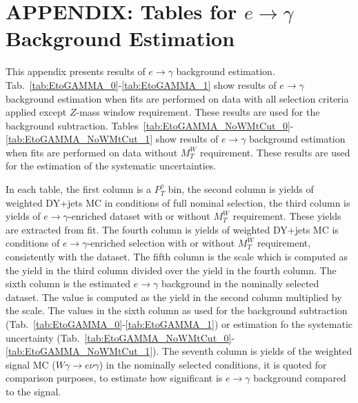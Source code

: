 \chapter{APPENDIX: Tables for $e\rightarrow\gamma$ Background Estimation}
\label{sec:etogTables}

This appendix presents results of $e\rightarrow\gamma$ background estimation. Tab.~\ref{tab:EtoGAMMA_0}-\ref{tab:EtoGAMMA_1} show results of $e\rightarrow\gamma$ background estimation when fits are performed on data with all selection criteria applied except $Z$-mass window requirement. These results are used for the background subtraction. Tables~\ref{tab:EtoGAMMA_NoWMtCut_0}-\ref{tab:EtoGAMMA_NoWMtCut_1} show results of $e\rightarrow\gamma$ background estimation when fits are performed on data without $M_T^W$ requirement. These results are used for the estimation of the systematic uncertainties.

In each table, the first column is a $P_T^{\gamma}$ bin, the second column is yields of weighted DY+jets MC in conditions of full nominal selection, the third column is yields of $e\rightarrow\gamma$-enriched dataset with or without $M_T^W$ requirement. These yields are extracted from fit. The fourth column is yields of weighted DY+jets MC is conditions of $e\rightarrow\gamma$-enriched selection with or without $M_T^W$ requirement, consistently with the dataset. The fifth column is the scale which is computed as the yield in the third column divided over the yield in the fourth column. The sixth column is the estimated $e\rightarrow\gamma$ background in the nominally selected dataset. The value is computed as the yield in the second column multiplied by the scale. The values in the sixth column as used for the background subtraction  (Tab.~\ref{tab:EtoGAMMA_0}-\ref{tab:EtoGAMMA_1}) or estimation fo the systematic uncertainty (Tab.~\ref{tab:EtoGAMMA_NoWMtCut_0}-\ref{tab:EtoGAMMA_NoWMtCut_1}). The seventh column is yields of the weighted signal MC ($W\gamma\rightarrow e\nu\gamma$) in the nominally selected conditions, it is quoted for comparison purposes, to estimate how significant is $e\rightarrow\gamma$ background compared to the signal.

